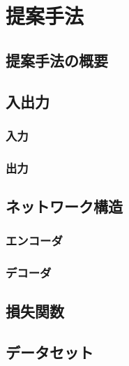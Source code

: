 \chapter{提案手法}\label{sec:Method}
\section{提案手法の概要}\label{sec:AbstOfMethod}

\section{入出力}\label{sec:InputAndOutput}

\subsection{入力}\label{sec:Input}

\subsection{出力}\label{sec:Output}

\section{ネットワーク構造}\label{sec:Network}

\subsection{エンコーダ}\label{sec:Encoder}

\subsection{デコーダ}\label{sec:Decoder}

\section{損失関数}\label{sec:LossFunction}

\section{データセット}\label{sec:Dataset}